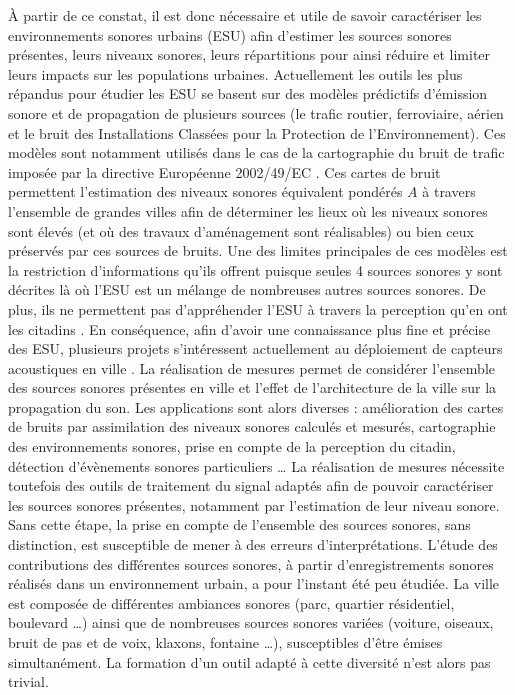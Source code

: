 À partir de ce constat, il est donc nécessaire et utile de savoir caractériser les environnements sonores urbains (ESU) afin d'estimer les sources sonores présentes, leurs niveaux sonores, leurs répartitions pour ainsi réduire et limiter leurs impacts sur les populations urbaines.
Actuellement les outils les plus répandus pour étudier les ESU se basent sur des modèles prédictifs d'émission sonore et de propagation de plusieurs sources (le trafic routier, ferroviaire, aérien et le bruit des Installations Classées pour la Protection de l'Environnement). Ces modèles sont notamment utilisés dans le cas de la cartographie du bruit de trafic imposée par la directive Européenne 2002/49/EC \cite{directive}. Ces cartes de bruit permettent l'estimation des niveaux sonores équivalent pondérés $A$ à travers l'ensemble de grandes villes afin de déterminer les lieux où les niveaux sonores sont élevés (et où des travaux d'aménagement sont réalisables) ou bien ceux préservés par ces sources de bruits. Une des limites principales de ces modèles est la restriction d'informations qu'ils offrent puisque seules 4 sources sonores y sont décrites là où l'ESU est un mélange de nombreuses autres sources sonores. De plus, ils ne permettent pas d'appréhender l'ESU à travers la perception qu'en ont les citadins \cite{aumond2017modeling}. 
En conséquence, afin d'avoir une connaissance plus fine et précise des ESU, plusieurs projets s'intéressent actuellement au déploiement de capteurs acoustiques en ville \cite{picaut2017characterization,zambon2017life}. La réalisation de mesures permet de considérer l'ensemble des sources sonores présentes en ville et l'effet de l'architecture de la ville sur la propagation du son. Les applications sont alors diverses : amélioration des cartes de bruits par assimilation des niveaux sonores calculés et mesurés, cartographie des environnements sonores, prise en compte de la perception du citadin, détection d'évènements sonores particuliers \dots{}
La réalisation de mesures nécessite toutefois des outils de traitement du signal adaptés afin de pouvoir caractériser les sources sonores présentes, notamment par l'estimation de leur niveau sonore. Sans cette étape, la prise en compte de l'ensemble des sources sonores, sans distinction, est susceptible de mener à des erreurs d'interprétations. L'étude des contributions des différentes sources sonores, à partir d'enregistrements sonores réalisés dans un environnement urbain, a pour l'instant été peu étudiée. 
La ville est composée de différentes ambiances sonores (parc, quartier résidentiel, boulevard \dots{}) ainsi que de nombreuses sources sonores variées (voiture, oiseaux, bruit de pas et de voix, klaxons, fontaine \dots{}), susceptibles d'être émises simultanément. La formation d'un outil adapté à cette diversité n'est alors pas trivial.


